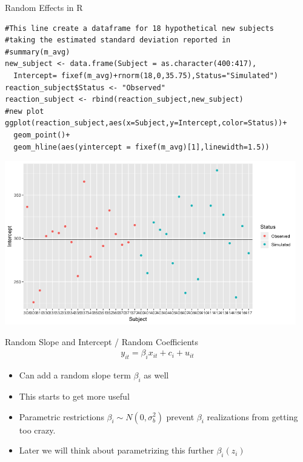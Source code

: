 \begin{frame}[fragile]{Random Effects in R}
\footnotesize
\begin{verbatim}
#This line create a dataframe for 18 hypothetical new subjects
#taking the estimated standard deviation reported in
#summary(m_avg)
new_subject <- data.frame(Subject = as.character(400:417),
  Intercept= fixef(m_avg)+rnorm(18,0,35.75),Status="Simulated")
reaction_subject$Status <- "Observed"
reaction_subject <- rbind(reaction_subject,new_subject)
#new plot
ggplot(reaction_subject,aes(x=Subject,y=Intercept,color=Status))+
  geom_point()+
  geom_hline(aes(yintercept = fixef(m_avg)[1],linewidth=1.5))

\end{verbatim}
\end{frame}

\begin{frame}%
\begin{center}
\includegraphics[width=5in]{./resources/random_intercepts2.png}
\end{center}
\end{frame}

\begin{frame}{Random Slope and Intercept / Random Coefficients}
\begin{align*}
y_{it} = \beta_i x_{it} + c_i + u_{it}
\end{align*}
\begin{itemize}
\item Can add a random slope term $\beta_i$ as well
\item This starts to get more useful
\item Parametric restrictions $\beta_i \sim N(0,\sigma_b^2)$ prevent $\beta_i$ realizations from getting too crazy.
\item Later we will think about parametrizing this further $\beta_i(z_i)$
\end{itemize}
\end{frame}




